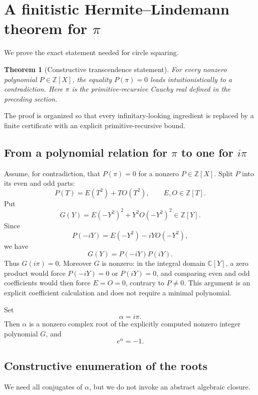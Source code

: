\documentclass[11pt]{article}
\newtheorem{theorem}{Theorem}[section]
\newcommand{\Z}{\mathbb{Z}}
\newcommand{\C}{\mathbb{C}}
\begin{document}
\section{A finitistic Hermite--Lindemann theorem for $\pi$}

We prove the exact statement needed for circle squaring.

\begin{theorem}[Constructive transcendence statement]\label{thm:pi-trans}
For every nonzero polynomial $P\in\Z[X]$, the equality $P(\pi)=0$ leads intuitionistically to a contradiction.  Here $\pi$ is the primitive-recursive Cauchy real defined in the preceding section.
\end{theorem}

The proof is organized so that every infinitary-looking ingredient is replaced by a finite certificate with an explicit primitive-recursive bound.

\subsection{From a polynomial relation for $\pi$ to one for $i\pi$}

Assume, for contradiction, that $P(\pi)=0$ for a nonzero $P\in\Z[X]$.  Split $P$ into its even and odd parts:
\[
  P(T)=E(T^2)+T O(T^2),\qquad E,O\in\Z[T].
\]
Put
\[
  G(Y)=E(-Y^2)^2+Y^2 O(-Y^2)^2\in\Z[Y].
\]
Since
\[
  P(-iY)=E(-Y^2)-iY O(-Y^2),
\]
we have
\[
  G(Y)=P(-iY)P(iY).
\]
Thus $G(i\pi)=0$.  Moreover $G$ is nonzero: in the integral domain $\C[Y]$, a zero product would force $P(-iY)=0$ or $P(iY)=0$, and comparing even and odd coefficients would then force $E=O=0$, contrary to $P\ne0$.  This argument is an explicit coefficient calculation and does not require a minimal polynomial.

Set
\[
  \alpha=i\pi.
\]
Then $\alpha$ is a nonzero complex root of the explicitly computed nonzero integer polynomial $G$, and
\[
  e^\alpha=-1.
\]

\subsection{Constructive enumeration of the roots}

We need all conjugates of $\alpha$, but we do not invoke an abstract algebraic closure.
\end{document}
